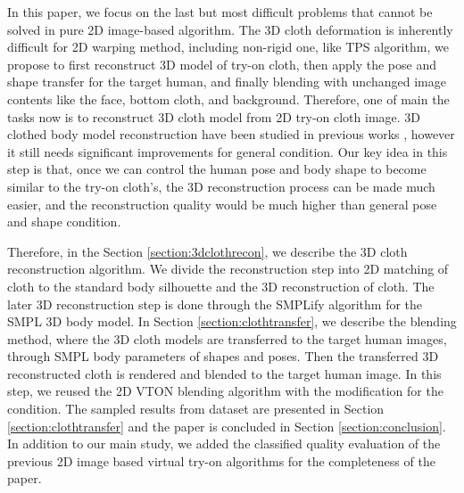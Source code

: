 In this paper, we focus on the last but most difficult problems that cannot be solved in pure 2D image-based algorithm. The 3D cloth deformation is inherently difficult for 2D warping method, including non-rigid one, like TPS algorithm, we propose to first reconstruct 3D model of try-on cloth, then apply the pose and shape transfer for the target human, and finally blending with unchanged image contents like the face, bottom cloth, and background. Therefore, one of main the tasks now is to reconstruct 3D cloth model from 2D try-on cloth image. 3D clothed body model reconstruction have been studied in previous works \cite{natsume2019siclope,saito2019pifu}, however it still needs significant improvements for general condition. Our key idea in this step is that, once we can control the human pose and body shape to become similar to the try-on cloth's, the 3D reconstruction process can be made much easier, and the reconstruction quality would be much higher than general pose and shape condition. 

Therefore, in the Section \ref{section:3dclothrecon}, we describe the 3D cloth reconstruction algorithm. We divide the reconstruction step into 2D matching of cloth to the standard body silhouette and the 3D reconstruction of cloth. The later 3D reconstruction step is done through the SMPLify\cite{Bogo2016SMPLify} algorithm for the SMPL 3D body model\cite{Loper2015SMPLAS}.  In Section \ref{section:clothtransfer}, we describe the blending method, where the 3D cloth models are transferred to the target human images, through SMPL body parameters of shapes and poses. Then the transferred 3D reconstructed cloth is rendered and blended to the target human image. In this step, we reused the 2D VTON blending algorithm with the modification for the condition.  The sampled results from dataset are presented in Section \ref{section:clothtransfer} and the paper is concluded in Section \ref{section:conclusion}. In addition to our main study, we added the classified quality evaluation of the previous 2D image based virtual try-on algorithms for the completeness of the paper.


